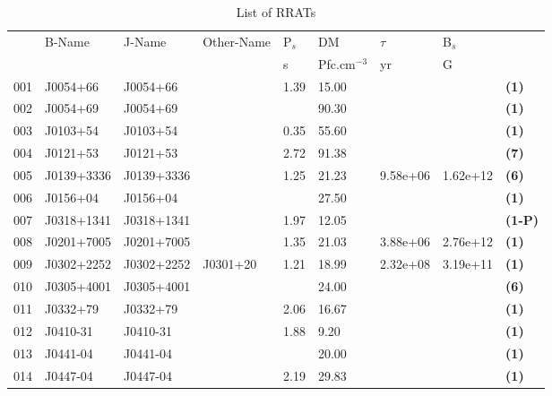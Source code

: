 \documentclass{jaa}
\begin{document}

%
\begin{table*} 
%
\caption{List of RRATs}
%
\label{t_list01}
%  
\begin{minipage}{0.95\textwidth}
%
\centering
\begin{tabular}{|l|l|l|l|l|l|l|l|l|} \toprule
     &  B-Name     & J-Name      & Other-Name  & P$_s$ &  DM    &  $\tau$    & B$_s$    &        \\
     &             &             &             &  s    & Pfc.cm$^{-3}$ & yr    & G        &        \\ \midrule
 001 & J0054+66    & J0054+66    &             &  1.39 &  15.00 &            &          &  {\bf (1)}   \\
 002 & J0054+69    & J0054+69    &             &       &  90.30 &            &          &  {\bf (1)}   \\
 003 & J0103+54    & J0103+54    &             &  0.35 &  55.60 &            &          &  {\bf (1)}   \\
 004 & J0121+53    & J0121+53    &             &  2.72 &  91.38 &            &          &  {\bf (7)}   \\
 005 & J0139+3336  & J0139+3336  &             &  1.25 &  21.23 &  9.58e+06  & 1.62e+12 &  {\bf (6)}   \\
 006 & J0156+04    & J0156+04    &             &       &  27.50 &            &          &  {\bf (1)}   \\
 007 & J0318+1341  & J0318+1341  &             &  1.97 &  12.05 &            &          &  {\bf (1-P)} \\
 008 & J0201+7005  & J0201+7005  &             &  1.35 &  21.03 &  3.88e+06  & 2.76e+12 &  {\bf (1)}   \\
 009 & J0302+2252  & J0302+2252  &  J0301+20   &  1.21 &  18.99 &  2.32e+08  & 3.19e+11 &  {\bf (1)}   \\
 010 & J0305+4001  & J0305+4001  &             &       &  24.00 &            &          &  {\bf (6)}   \\
 011 & J0332+79    & J0332+79    &             &  2.06 &  16.67 &            &          &  {\bf (1)}   \\
 012 & J0410-31    & J0410-31    &             &  1.88 &   9.20 &            &          &  {\bf (1)}   \\
 013 & J0441-04    & J0441-04    &             &       &  20.00 &            &          &  {\bf (1)}   \\
 014 & J0447-04    & J0447-04    &             &  2.19 &  29.83 &            &          &  {\bf (1)}   \\ 

\end{tabular}
\end{minipage}
\end{table*}
\end{document}
